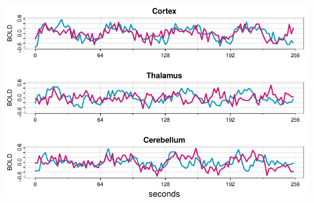 \documentclass[
  letterpaper,
  DIV=11,
  numbers=noendperiod]{scrreprt}
\begin{document}
\includegraphics{LectureNotes/Lecture1_files/figure-pdf/ex-1-6-no-lines-1.pdf}
\end{document}

